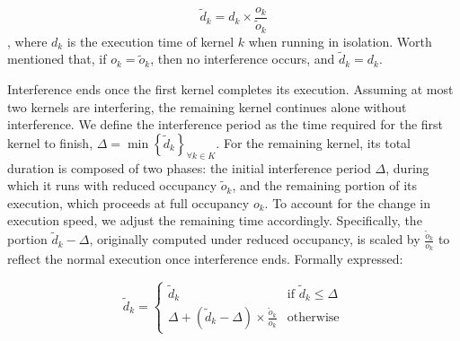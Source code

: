 \begin{equation*}
	\tilde{d}_k = d_k \times \frac{o_k}{\tilde{o}_k}
\end{equation*}
, where $d_k$ is the execution time of kernel $k$ when running in isolation. Worth mentioned that, if $o_k = \tilde{o}_k$, then no interference occurs, and $\tilde{d}_k = d_k$.



Interference ends once the first kernel completes its execution. Assuming at most two kernels are interfering, the remaining kernel continues alone without interference. We define the interference period as the time required for the first kernel to finish, $\Delta = \min \left\{ \tilde{d}_k \right\}_{\forall k \in K}$.
For the remaining kernel, its total duration is composed of two phases: the initial interference period $\Delta$, during which it runs with reduced occupancy $\tilde{o}_k$, and the remaining portion of its execution, which proceeds at full occupancy $o_k$. To account for the change in execution speed, we adjust the remaining time accordingly. Specifically, the portion $\tilde{d}_k - \Delta$, originally computed under reduced occupancy, is scaled by $\frac{\tilde{o}_k}{o_k}$ to reflect the normal execution once interference ends. Formally expressed:

\begin{equation}
	\tilde{d}_k =
	\begin{cases}
		\tilde{d}_k & \text{if } \tilde{d}_k \leq \Delta \\
		\Delta + \left( \tilde{d}_k - \Delta \right) \times \frac{\tilde{o}_k}{o_k} & \text{otherwise}
	\end{cases}
\end{equation}


